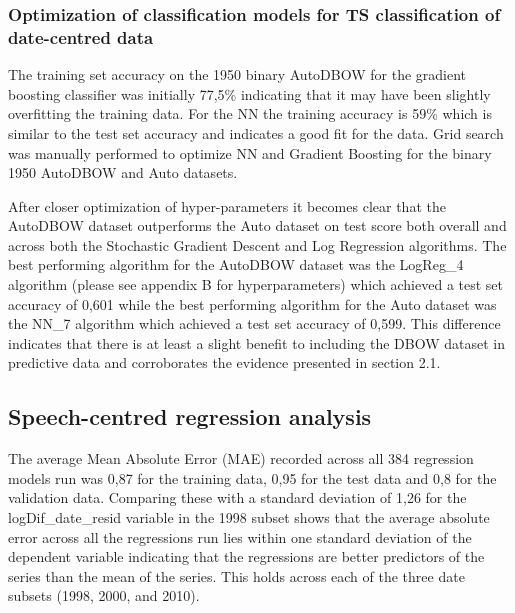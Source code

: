 \documentclass[11pt,preprint, authoryear]{elsarticle}
\numberwithin{equation}{section}
\numberwithin{figure}{section}
\numberwithin{table}{section}
\begin{document}
\hypertarget{optimization-of-classification-models-for-ts-classification-of-date-centred-data}{%
\subsubsection{Optimization of classification models for TS
classification of date-centred
data}\label{optimization-of-classification-models-for-ts-classification-of-date-centred-data}}

The training set accuracy on the 1950 binary AutoDBOW for the gradient
boosting classifier was initially 77,5\% indicating that it may have
been slightly overfitting the training data. For the NN the training
accuracy is 59\% which is similar to the test set accuracy and indicates
a good fit for the data. Grid search was manually performed to optimize
NN and Gradient Boosting for the binary 1950 AutoDBOW and Auto datasets.

After closer optimization of hyper-parameters it becomes clear that the
AutoDBOW dataset outperforms the Auto dataset on test score both overall
and across both the Stochastic Gradient Descent and Log Regression
algorithms. The best performing algorithm for the AutoDBOW dataset was
the LogReg\_4 algorithm (please see appendix B for hyperparameters)
which achieved a test set accuracy of 0,601 while the best performing
algorithm for the Auto dataset was the NN\_7 algorithm which achieved a
test set accuracy of 0,599. This difference indicates that there is at
least a slight benefit to including the DBOW dataset in predictive data
and corroborates the evidence presented in section 2.1.

\hypertarget{speech-centred-regression-analysis}{%
\subsection{Speech-centred regression
analysis}\label{speech-centred-regression-analysis}}

The average Mean Absolute Error (MAE) recorded across all 384 regression
models run was 0,87 for the training data, 0,95 for the test data and
0,8 for the validation data. Comparing these with a standard deviation
of 1,26 for the logDif\_date\_resid variable in the 1998 subset shows
that the average absolute error across all the regressions run lies
within one standard deviation of the dependent variable indicating that
the regressions are better predictors of the series than the mean of the
series. This holds across each of the three date subsets (1998, 2000,
and 2010).
\end{document}

